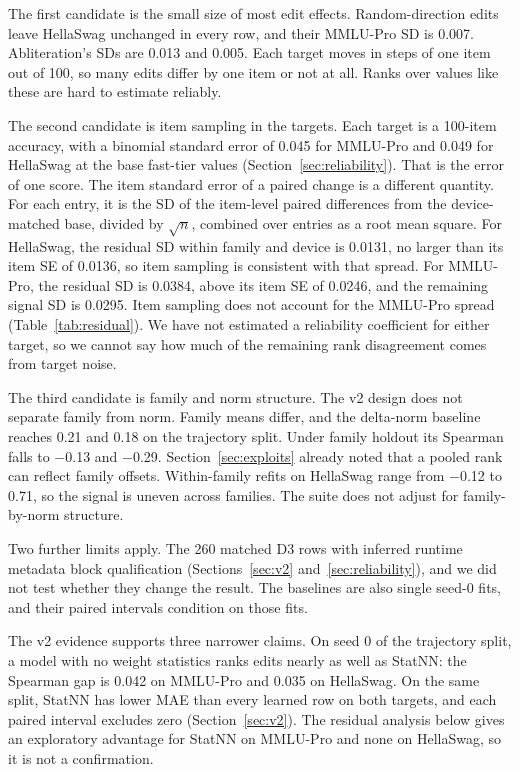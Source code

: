 The first candidate is the small size of most edit effects. Random-direction edits leave HellaSwag unchanged in every row, and their MMLU-Pro SD is 0.007. Abliteration's SDs are 0.013 and 0.005. Each target moves in steps of one item out of 100, so many edits differ by one item or not at all. Ranks over values like these are hard to estimate reliably.

The second candidate is item sampling in the targets. Each target is a 100-item accuracy, with a binomial standard error of 0.045 for MMLU-Pro and 0.049 for HellaSwag at the base fast-tier values (Section~\ref{sec:reliability}). That is the error of one score. The item standard error of a paired change is a different quantity. For each entry, it is the SD of the item-level paired differences from the device-matched base, divided by $\sqrt{n}$, combined over entries as a root mean square. For HellaSwag, the residual SD within family and device is 0.0131, no larger than its item SE of 0.0136, so item sampling is consistent with that spread. For MMLU-Pro, the residual SD is 0.0384, above its item SE of 0.0246, and the remaining signal SD is 0.0295. Item sampling does not account for the MMLU-Pro spread (Table~\ref{tab:residual}). We have not estimated a reliability coefficient for either target, so we cannot say how much of the remaining rank disagreement comes from target noise.

The third candidate is family and norm structure. The v2 design does not separate family from norm. Family means differ, and the delta-norm baseline reaches 0.21 and 0.18 on the trajectory split. Under family holdout its Spearman falls to $-$0.13 and $-$0.29. Section~\ref{sec:exploits} already noted that a pooled rank can reflect family offsets. Within-family refits on HellaSwag range from $-$0.12 to 0.71, so the signal is uneven across families. The suite does not adjust for family-by-norm structure.

Two further limits apply. The 260 matched D3 rows with inferred runtime metadata block qualification (Sections~\ref{sec:v2} and~\ref{sec:reliability}), and we did not test whether they change the result. The baselines are also single seed-0 fits, and their paired intervals condition on those fits.

The v2 evidence supports three narrower claims. On seed 0 of the trajectory split, a model with no weight statistics ranks edits nearly as well as StatNN: the Spearman gap is 0.042 on MMLU-Pro and 0.035 on HellaSwag. On the same split, StatNN has lower MAE than every learned row on both targets, and each paired interval excludes zero (Section~\ref{sec:v2}). The residual analysis below gives an exploratory advantage for StatNN on MMLU-Pro and none on HellaSwag, so it is not a confirmation.

